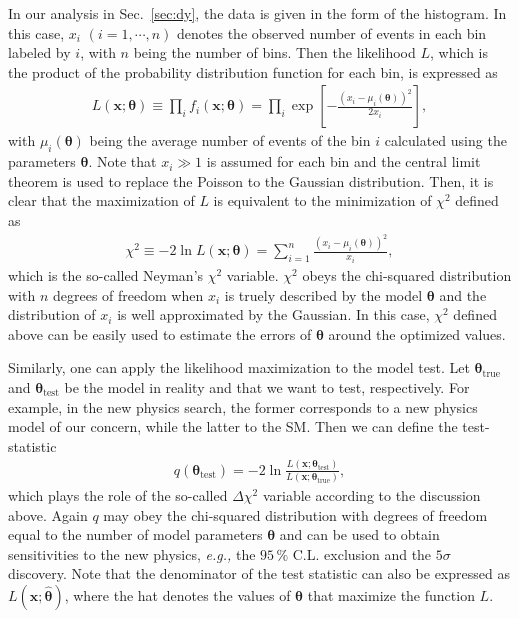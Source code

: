 \documentclass[12pt,twoside,book]{article}
\begin{document}
In our analysis in Sec.~\ref{sec:dy}, the data is given in the form of the histogram.
In this case, $x_i$ $(i=1, \cdots, n)$ denotes the observed number of events in each bin labeled by $i$, with $n$ being the number of bins.
Then the likelihood $L$, which is the product of the probability distribution function for each bin, is expressed as
\begin{align}
  L(\bm{x} ; \bm{\theta}) \equiv \prod_i f_i(\bm{x} ; \bm{\theta}) = \prod_i \exp \left[
    - \frac{\left(x_i - \mu_i (\bm{\theta}) \right)^2}{2 x_i}
  \right],
\end{align}
with $\mu_i (\bm{\theta})$ being the average number of events of the bin $i$ calculated using the parameters $\bm{\theta}$.
Note that $x_i \gg 1$ is assumed for each bin and the central limit theorem is used to replace the Poisson to the Gaussian distribution.
Then, it is clear that the maximization of $L$ is equivalent to the minimization of $\chi^2$ defined as
\begin{align}
  \chi^2 \equiv -2 \ln L(\bm{x} ; \bm{\theta}) = \sum_{i=1}^{n}
  \frac{\left(x_i - \mu_i (\bm{\theta}) \right)^2}{x_i},
\end{align}
which is the so-called Neyman's $\chi^2$ variable.
$\chi^2$ obeys the chi-squared distribution with $n$ degrees of freedom when $x_i$ is truely described by the model $\bm{\theta}$ and the distribution of $x_i$ is well approximated by the Gaussian.
In this case, $\chi^2$ defined above can be easily used to estimate the errors of $\bm{\theta}$ around the optimized values.

Similarly, one can apply the likelihood maximization to the model test.
Let $\bm{\theta}_{\mathrm{true}}$ and $\bm{\theta}_{\mathrm{test}}$ be the model in reality and that we want to test, respectively.
For example, in the new physics search, the former corresponds to a new physics model of our concern, while the latter to the SM.
Then we can define the test-statistic
\begin{align}
  q (\bm{\theta}_{\mathrm{test}}) =
  -2 \ln \frac{L(\bm{x} ; \bm{\theta}_{\mathrm{test}})}
  {L(\bm{x} ; \bm{\theta}_{\mathrm{true}})},
\end{align}
which plays the role of the so-called $\Delta \chi^2$ variable according to the discussion above.
Again $q$ may obey the chi-squared distribution with degrees of freedom equal to the number of model parameters $\bm{\theta}$ and can be used to obtain sensitivities to the new physics, \textit{e.g.,} the $95\,\%$ C.L. exclusion and the $5\sigma$ discovery.
Note that the denominator of the test statistic can also be expressed as $L(\bm{x} ; \hat{\bm{\theta}})$, where the hat denotes the values of $\bm{\theta}$ that maximize the function $L$.
\end{document}
